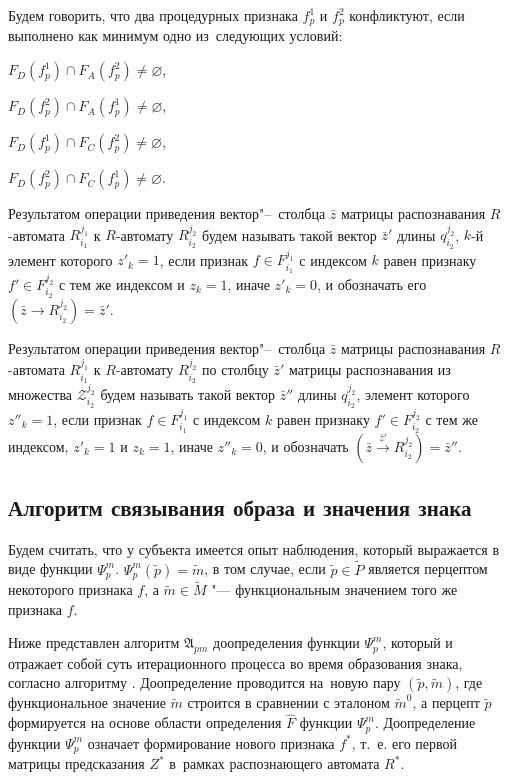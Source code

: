 \documentclass[a4paper, 12pt]{article}
\numberwithin{equation}{section}
\begin{document}
		Будем говорить, что два процедурных признака $f_p^1$ и $f_p^2$ конфликтуют, если выполнено как минимум одно из~следующих условий:

		\indent $F_D(f_p^1)\cap F_A(f_p^2)\not=\varnothing$,

		\indent $F_D(f_p^2)\cap F_A(f_p^1)\not=\varnothing$,

		\indent $F_D(f_p^1)\cap F_C(f_p^2)\not=\varnothing$,

		\indent $F_D(f_p^2)\cap F_C(f_p^1)\not=\varnothing$.
	
		Результатом операции приведения вектор"--~столбца $\bar z$ матрицы распознавания $R$-автомата $R_{i_1}^{j_1}$ к $R$-автомату $R_{i_2}^{j_2}$ будем называть такой вектор $\bar z'$ длины $q_{i_2}^{j_2}$, $k$-й элемент которого $z'_k=1$, если признак $f\in F_{i_1}^{j_1}$ с индексом $k$ равен признаку $f'\in F_{i_2}^{j_2}$ с тем же индексом и $z_k=1$, иначе $z'_k=0$, и обозначать его $(\bar z\rightarrow R_{i_2}^{j_2})=\bar z'$.
	
		Результатом операции приведения вектор"--~столбца $\bar z$ матрицы распознавания $R$-автомата $R_{i_1}^{j_1}$ к $R$-автомату $R_{i_2}^{j_2}$ по столбцу $\bar z'$ матрицы распознавания из множества  $\mathcal Z_{i_2}^{j_2}$ будем называть такой вектор $\bar z''$ длины $q_{i_2}^{j_2}$, элемент которого $z''_k=1$, если признак $f\in F_{i_1}^{j_1}$ с индексом $k$ равен признаку $f'\in F_{i_2}^{j_2}$ с тем же индексом, $z'_k=1$ и $z_k=1$, иначе $z''_k=0$, и обозначать $(\bar z\xrightarrow{\bar z'} R_{i_2}^{j_2})=\bar z''$.
	
	\subsection{Алгоритм связывания образа и значения знака}
	Будем считать, что у субъекта имеется опыт наблюдения, который выражается в виде функции $\Psi_p^m$. $\Psi_p^m(\tilde p)=\tilde m$, в том случае, если $\tilde p\in\tilde P$ является перцептом некоторого признака $f$, а $\tilde m\in\tilde M$ "--- функциональным значением того же признака $f$.
	
	Ниже представлен алгоритм $\mathfrak A_{pm}$ доопределения функции $\Psi_p^m$, который и отражает собой суть итерационного процесса во время образования знака, согласно алгоритму \cite{PanovA2014a}. Доопределение проводится на~новую пару $(\tilde p,\tilde m)$, где функциональное значение $\tilde m$ строится в сравнении с эталоном $\tilde m^0$, а перцепт $\tilde p$ формируется на основе области определения $\hat F$ функции $\Psi_p^m$. Доопределение функции $\Psi_p^m$ означает формирование нового признака $f^*$, т.~е. его первой матрицы предсказания $Z^*$ в~рамках распознающего автомата $R^*$.
	
\end{document}
